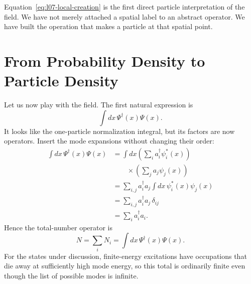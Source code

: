 Equation~\eqref{eq:l07-local-creation} is the first direct particle interpretation of the field. We have not merely attached a spatial label to an abstract operator. We have built the operation that makes a particle at that spatial point.

\begin{classroomqa}
\end{classroomqa}

\begin{classroomqa}
\end{classroomqa}

\section{From Probability Density to Particle Density}

Let us now play with the field. The first natural expression is
\begin{equation}
\int dx\,\Psi^\dagger(x)\Psi(x).
\end{equation}
It looks like the one-particle normalization integral, but its factors are now operators. Insert the mode expansions without changing their order:
\begin{align}
\int dx\,\Psi^\dagger(x)\Psi(x)
&=\int dx
\left(\sum_i a_i^\dagger\psi_i^*(x)\right)\\
&\qquad\times\left(\sum_j a_j\psi_j(x)\right) \\
&=\sum_{i,j}a_i^\dagger a_j
\int dx\,\psi_i^*(x)\psi_j(x) \\
&=\sum_{i,j}a_i^\dagger a_j\,\delta_{ij} \\
&=\sum_i a_i^\dagger a_i.
\label{eq:l07-number-derivation}
\end{align}
Hence the total-number operator is
\begin{equation}
N=\sum_i N_i
=\int dx\,\Psi^\dagger(x)\Psi(x).
\label{eq:l07-total-number}
\end{equation}
For the states under discussion, finite-energy excitations have occupations that die away at sufficiently high mode energy, so this total is ordinarily finite even though the list of possible modes is infinite.

